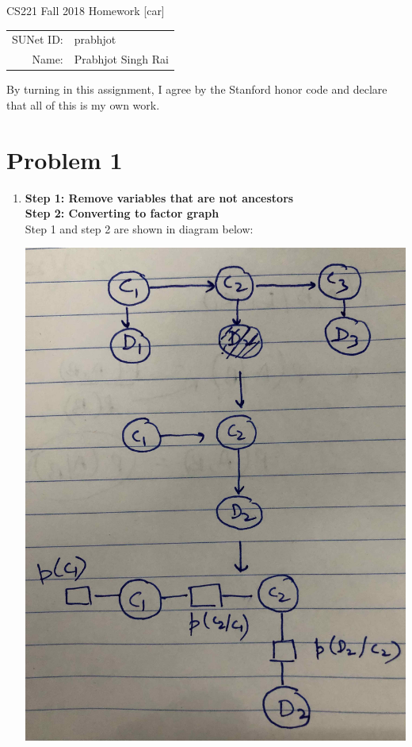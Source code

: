 \documentclass[12pt]{article}
\begin{document}
\begin{center}
{\Large CS221 Fall 2018 Homework [car]}

\begin{tabular}{rl}
SUNet ID: & prabhjot \\
Name: & Prabhjot Singh Rai
\end{tabular}
\end{center}

By turning in this assignment, I agree by the Stanford honor code and declare
that all of this is my own work.

\section*{Problem 1}

\begin{enumerate}[label=(\alph*)]
  \item 
  \textbf{Step 1: Remove variables that are not ancestors} \\
  \textbf{Step 2: Converting to factor graph} \\
  Step 1 and step 2 are shown in diagram below:
  \begin{center}
  \includegraphics[scale=0.1]{IMG_2276}

\end{center}
\end{enumerate}
\end{document}
